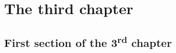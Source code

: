 \chapter{The third chapter} %
\label{ch:methods} %

\section{First section of the 3\textsuperscript{rd} chapter}
\blindtext
